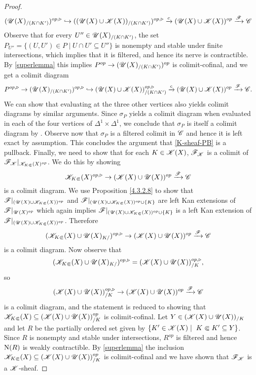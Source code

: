 \documentclass[../../thesis.tex]{subfiles}
\begin{document}
\begin{proof}
    \[
        (\mathscr{U}(X)_{/(K\cap K')})^{op,\triangleright} \hookrightarrow ((\mathscr{U}(X) \cup \mathscr{K}(X))_{/(K\cap K')})^{op,\triangleright} \xrightarrow{c} (\mathscr{U}(X) \cup \mathscr{K}(X))^{op} \xrightarrow{\mathscr{F}}\mathscr{C}
    \]
    Observe that for every $U'' \in \mathscr{U}(X)_{/(K\cap K')}$, the set
    $P_{U''} = \{(U,U') \in P \mid U\cap U' \subseteq U''\}$ is nonempty and stable under finite intersections, which implies that it is filtered, and hence its nerve is contractible.
    By \ref{superlemma} this implies $P^{op} \to (\mathscr{U}(X)_{/(K\cap K')})^{op}$ is colimit-cofinal, and we get a colimit diagram
    \[
        P^{op,\triangleright} \to(\mathscr{U}(X)_{/(K\cap K')})^{op,\triangleright} \hookrightarrow (\mathscr{U}(X) \cup \mathscr{K}(X))_{/(K\cap K')}^{op,\triangleright} \xrightarrow{c} (\mathscr{U}(X) \cup \mathscr{K}(X))^{op} \xrightarrow{\mathscr{F}}\mathscr{C}.
    \]
    We can show that evaluating at the three other vertices also yields colimit diagrams by similar arguments.
    Since $\sigma_P$ yields a colimit diagram when evaluated in each of the four vertices of $\Delta^1 \times \Delta^1$, we conclude that $\sigma_P$ is itself a colimit diagram by \cite[Proposition 5.1.2.2]{HTT}.
    Observe now that $\sigma_P$ is a filtered colimit in $\mathscr{C}$ and hence it is left exact by assumption.
    This concludes the argument that \ref{K-sheaf-PB} is a pullback.
    Finally, we need to show that for each $K \in \mathscr{K}(X)$, $\mathscr{F}_{\mathscr{K}}$ is a colimit of $\mathscr{F}_{\mathscr{K}}|_{\mathscr{K}_{K\Subset}(X)^{op}}$.
    We do this by showing
    \[
        \mathscr{K}_{K\Subset}(X)^{op,\triangleright} \to (\mathscr{K}(X) \cup \mathscr{U}(X))^{op} \xrightarrow{\mathscr{F}} \mathscr{C}
    \]
    is a colimit diagram.
    We use Proposition \ref{4.3.2.8} to show that
    $\mathscr{F}|_{(\mathscr{U}(X) \cup \mathscr{K}_{K\Subset}(X))^{op}}$ and ${\mathscr{F}|_{(\mathscr{U}(X) \cup \mathscr{K}_{K\Subset}(X))^{op} \cup \{K\}}}$ are left Kan extensions of $\mathscr{F}|_{\mathscr{U}(X)^{op}}$ which again implies $\mathscr{F}|_{(\mathscr{U}(X) \cup \mathscr{K}_{K\Subset}(X))^{op} \cup \{K\}}$ is a left Kan extension of $\mathscr{F}|_{(\mathscr{U}(X) \cup \mathscr{K}_{K\Subset}(X))^{op}}$.
    Therefore
    \[
        (\mathscr{K}_{K\Subset}(X) \cup \mathscr{U}(X)_{K/})^{op,\triangleright} \to (\mathscr{K}(X) \cup \mathscr{U}(X))^{op} \xrightarrow{\mathscr{F}} \mathscr{C}
    \]
    is a colimit diagram.
    Now observe that
    \[
        (\mathscr{K}_{K\Subset}(X) \cup \mathscr{U}(X)_{K/})^{op,\triangleright} = (\mathscr{K}(X) \cup \mathscr{U}(X))^{op,\triangleright}_{/K},
    \]
    so
    \[
        (\mathscr{K}(X) \cup \mathscr{U}(X))^{op,\triangleright}_{/K} \to (\mathscr{K}(X) \cup \mathscr{U}(X))^{op} \xrightarrow{\mathscr{F}} \mathscr{C}
    \]
    is a colimit diagram, and the statement is reduced to showing that $\mathscr{K}_{K\Subset}(X) \subseteq (\mathscr{K}(X) \cup \mathscr{U}(X))_{/K}^{op}$ is colimit-cofinal.
    Let $Y\in (\mathscr{K}(X) \cup \mathscr{U}(X))_{/K}$ and let $R$ be the partially ordered set given by $\{K' \in \K(X) \mid K \Subset K ' \subseteq Y\}$.
    Since $R$ is nonempty and stable under intersections, $R^{op}$ is filtered and hence $\mathrm{N}(R)$ is weakly contractible.
    By \ref{superlemma} the inclusion $\mathscr{K}_{K\Subset}(X) \subseteq (\mathscr{K}(X) \cup \mathscr{U}(X))_{/K}^{op}$ is colimit-cofinal and we have shown that $\mathscr{F}_{\mathscr{K}}$ is a $\mathscr{K}$-sheaf.
\end{proof}
\end{document}
